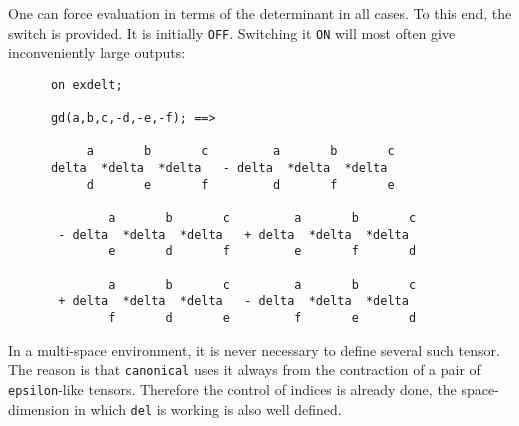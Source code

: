One can force evaluation in terms of the determinant in all cases.
\hypertarget{switch:EXDELT}{}
To this end, the switch  is provided. It is initially
\texttt{OFF}. Switching it \texttt{ON} will most often give inconveniently large outputs:
\begin{verbatim}
      on exdelt;

      gd(a,b,c,-d,-e,-f); ==>

           a       b       c         a       b       c
      delta  *delta  *delta   - delta  *delta  *delta
           d       e       f         d       f       e

              a       b       c         a       b       c
       - delta  *delta  *delta   + delta  *delta  *delta
              e       d       f         e       f       d

              a       b       c         a       b       c
       + delta  *delta  *delta   - delta  *delta  *delta
              f       d       e         f       e       d
\end{verbatim}
In a multi-space environment, it is never necessary to define several
such tensor. The reason is that \texttt{canonical} uses it
always from the contraction of a pair of \texttt{epsilon}-like tensors.
Therefore the  control of indices is already done, the space-dimension
in which \texttt{del} is working  is also well defined.

